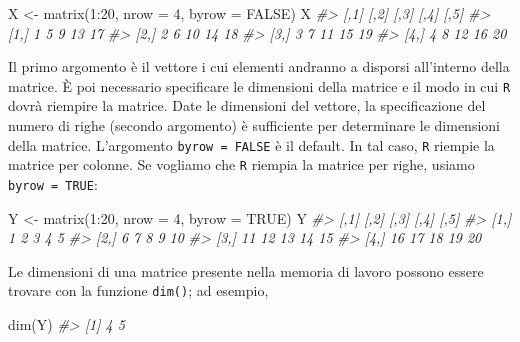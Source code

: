\documentclass[
]{memoir}
\newenvironment{Shaded}{\begin{snugshade}}{\end{snugshade}}
\newcommand{\AttributeTok}[1]{\textcolor[rgb]{0.77,0.63,0.00}{#1}}
\newcommand{\CommentTok}[1]{\textcolor[rgb]{0.56,0.35,0.01}{\textit{#1}}}
\newcommand{\ConstantTok}[1]{\textcolor[rgb]{0.00,0.00,0.00}{#1}}
\newcommand{\DecValTok}[1]{\textcolor[rgb]{0.00,0.00,0.81}{#1}}
\newcommand{\FunctionTok}[1]{\textcolor[rgb]{0.00,0.00,0.00}{#1}}
\newcommand{\NormalTok}[1]{#1}
\newcommand{\OtherTok}[1]{\textcolor[rgb]{0.56,0.35,0.01}{#1}}
\newcommand{\SpecialCharTok}[1]{\textcolor[rgb]{0.00,0.00,0.00}{#1}}
\theoremstyle{definition}
\theoremstyle{definition}
\theoremstyle{definition}
\theoremstyle{definition}
\theoremstyle{remark}
\begin{document}
\begin{Shaded}
\begin{Highlighting}[]
\NormalTok{X }\OtherTok{\textless{}{-}} \FunctionTok{matrix}\NormalTok{(}\DecValTok{1}\SpecialCharTok{:}\DecValTok{20}\NormalTok{, }\AttributeTok{nrow =} \DecValTok{4}\NormalTok{, }\AttributeTok{byrow =} \ConstantTok{FALSE}\NormalTok{)}
\NormalTok{X}
\CommentTok{\#\textgreater{}      [,1] [,2] [,3] [,4] [,5]}
\CommentTok{\#\textgreater{} [1,]    1    5    9   13   17}
\CommentTok{\#\textgreater{} [2,]    2    6   10   14   18}
\CommentTok{\#\textgreater{} [3,]    3    7   11   15   19}
\CommentTok{\#\textgreater{} [4,]    4    8   12   16   20}
\end{Highlighting}
\end{Shaded}

Il primo argomento è il vettore i cui elementi andranno a disporsi
all'interno della matrice. È poi necessario specificare le dimensioni
della matrice e il modo in cui \texttt{R} dovrà riempire la matrice. Date le
dimensioni del vettore, la specificazione del numero di righe (secondo
argomento) è sufficiente per determinare le dimensioni della matrice.
L'argomento \texttt{byrow\ =\ FALSE} è il default. In tal caso, \texttt{R} riempie la
matrice per colonne. Se vogliamo che \texttt{R} riempia la matrice per righe,
usiamo \texttt{byrow\ =\ TRUE}:

\begin{Shaded}
\begin{Highlighting}[]
\NormalTok{Y }\OtherTok{\textless{}{-}} \FunctionTok{matrix}\NormalTok{(}\DecValTok{1}\SpecialCharTok{:}\DecValTok{20}\NormalTok{, }\AttributeTok{nrow =} \DecValTok{4}\NormalTok{, }\AttributeTok{byrow =} \ConstantTok{TRUE}\NormalTok{)}
\NormalTok{Y}
\CommentTok{\#\textgreater{}      [,1] [,2] [,3] [,4] [,5]}
\CommentTok{\#\textgreater{} [1,]    1    2    3    4    5}
\CommentTok{\#\textgreater{} [2,]    6    7    8    9   10}
\CommentTok{\#\textgreater{} [3,]   11   12   13   14   15}
\CommentTok{\#\textgreater{} [4,]   16   17   18   19   20}
\end{Highlighting}
\end{Shaded}

Le dimensioni di una matrice presente nella memoria di lavoro possono
essere trovare con la funzione \texttt{dim()}; ad esempio,

\begin{Shaded}
\begin{Highlighting}[]
\FunctionTok{dim}\NormalTok{(Y)}
\CommentTok{\#\textgreater{} [1] 4 5}
\end{Highlighting}
\end{Shaded}
\end{document}
